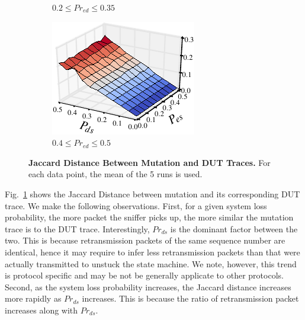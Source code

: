 \begin{figure}[h!]
\begin{subfigure}{0.33\textwidth}
    \caption{$0.2 \le Pr_{ed} \le 0.35$}
  \end{subfigure}\hspace*{0.01\textwidth}
  \begin{subfigure}{0.33\textwidth}
    \centering
    \includegraphics[width=\textwidth]{./figures/scripts/MutationDUTJaccard3DFigure_0_50.pdf}
    \caption{$0.4 \le Pr_{ed} \le 0.5$}
  \end{subfigure}\hspace*{0.01\textwidth}
  \caption{\textbf{Jaccard Distance Between Mutation and DUT Traces.} For each
  data point, the mean of the 5 runs is used.}
  \label{fig:mutation_dut}
  \vspace*{-5mm}
\end{figure}


Fig.~\ref{fig:mutation_dut} shows the Jaccard Distance between mutation and
its corresponding DUT trace.
We make the following observations.
First, for a given system loss probability, the more packet the sniffer picks up,
the more similar the mutation trace is to the DUT trace.
Interestingly, $Pr_{ds}$ is the dominant factor between the two.
This is because retransmission packets of the same sequence number are
identical, hence it may require to infer less retransmission packets than that
were actually transmitted to unstuck the state machine.
We note, however, this
trend is protocol specific and may be not be generally applicate to other
protocols.
Second, as the system loss probability increases, the Jaccard distance increases
more rapidly as $Pr_{ds}$ increases.
This is because the ratio of retransmission
packet increases along with $Pr_{ds}$.


